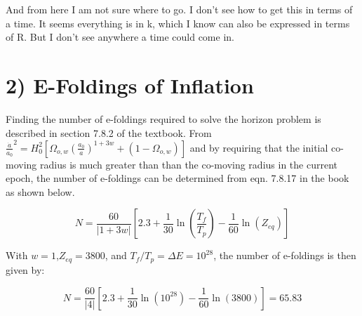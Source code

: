 \documentclass[a4paper,11pt]{article}
\begin{document}
And from here I am not sure where to go.  I don't see how to get this in terms of a time.  It seems everything is in k, which I know can also be expressed in terms of R.  But I don't see anywhere a time could come in. 

\section*{2) E-Foldings of Inflation}
Finding the number of e-foldings required to solve the horizon problem is described in section 7.8.2 of the textbook.  From $\frac{\dot{a}}{a_0}^2 = H_0^2 [ \Omega_{o,w}(\frac{a_0}{a})^{1+3w} + (1-\Omega_{o,w})]$ and by requiring that the initial co-moving radius is much greater than than the co-moving radius in the current epoch, the number of e-foldings can be determined from eqn. 7.8.17 in the book as shown below.

\begin{equation}
N = \frac{60}{|1+3w|} [2.3 + \frac{1}{30}\ln(\frac{T_f}{T_p}) - \frac{1}{60}\ln(Z_{eq})]
\end{equation}


With $w=1$,$ Z_{eq} = 3800$, and $T_f/T_p = \Delta E = 10^{28}$, the number of e-foldings is then given by: 

\begin{equation}
N = \frac{60}{|4|} [2.3 + \frac{1}{30}\ln(10^{28}) - \frac{1}{60}\ln(3800)] = 65.83
\end{equation}
\end{document}
